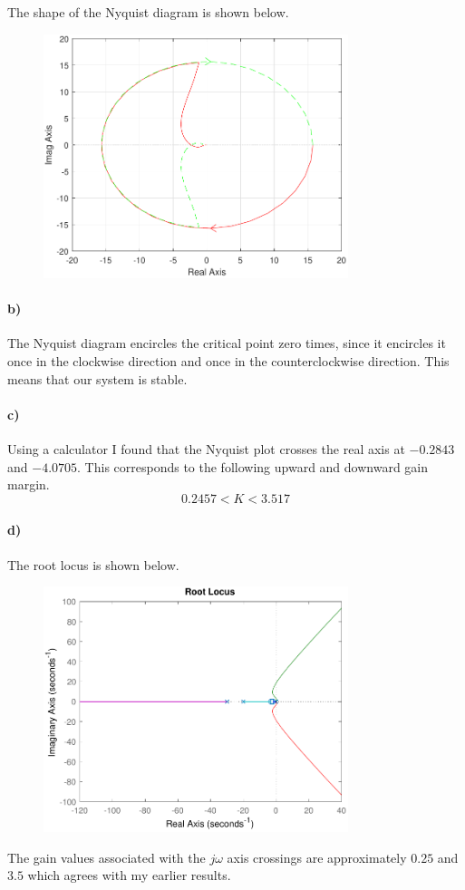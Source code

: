 \documentclass[12pt]{article}
\begin{document}
The shape of the Nyquist diagram is shown below.
\begin{figure}[H]
    \begin{center}
        \includegraphics[width=3.5in]{problem3a.pdf}
    \end{center}
\end{figure}

\paragraph{b)}

The Nyquist diagram encircles the critical point zero times, since it encircles it once in the clockwise direction
and once in the counterclockwise direction. This means that our system is stable.

\paragraph{c)}

Using a calculator I found that the Nyquist plot crosses the real axis at \(-0.2843\) and \(-4.0705\). This corresponds to
the following upward and downward gain margin.
\[0.2457<K<3.517\]

\paragraph{d)}

The root locus is shown below.
\begin{figure}[H]
    \begin{center}
        \includegraphics[width=3.5in]{problem3d.pdf}
    \end{center}
\end{figure}
The gain values associated with the \(j\omega\) axis crossings are approximately \(0.25\) and \(3.5\) which agrees
with my earlier results.
\end{document}
